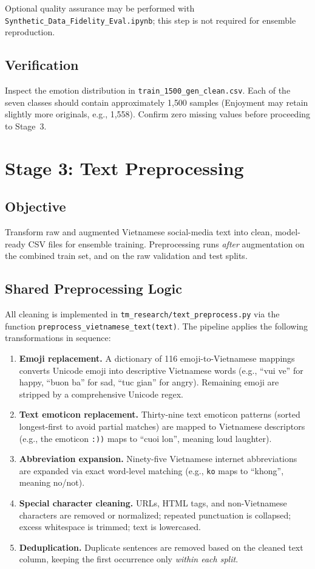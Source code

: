 \documentclass[11pt,a4paper]{article}
\newcommand{\repo}[1]{\texttt{#1}}
\begin{document}
Optional quality assurance may be performed with \repo{Synthetic\_Data\_Fidelity\_Eval.ipynb}; this step is not required for ensemble reproduction.

\subsection{Verification}
Inspect the emotion distribution in \repo{train\_1500\_gen\_clean.csv}. Each of the seven classes should contain approximately 1{,}500 samples (Enjoyment may retain slightly more originals, e.g., 1{,}558). Confirm zero missing values before proceeding to Stage~3.

\section{Stage 3: Text Preprocessing}
\label{sec:preprocessing}

\subsection{Objective}
Transform raw and augmented Vietnamese social-media text into clean, model-ready CSV files for ensemble training. Preprocessing runs \emph{after} augmentation on the combined train set, and on the raw validation and test splits.

\subsection{Shared Preprocessing Logic}
All cleaning is implemented in \repo{tm\_research/text\_preprocess.py} via the function \texttt{preprocess\_vietnamese\_text(text)}. The pipeline applies the following transformations in sequence:
\begin{enumerate}[label=\arabic*.]
  \item \textbf{Emoji replacement.} A dictionary of 116 emoji-to-Vietnamese mappings converts Unicode emoji into descriptive Vietnamese words (e.g., ``vui ve'' for happy, ``buon ba'' for sad, ``tuc gian'' for angry). Remaining emoji are stripped by a comprehensive Unicode regex.
  \item \textbf{Text emoticon replacement.} Thirty-nine text emoticon patterns (sorted longest-first to avoid partial matches) are mapped to Vietnamese descriptors (e.g., the emoticon \lstinline|:))| maps to ``cuoi lon'', meaning loud laughter).
  \item \textbf{Abbreviation expansion.} Ninety-five Vietnamese internet abbreviations are expanded via exact word-level matching (e.g., \texttt{ko} maps to ``khong'', meaning no/not).
  \item \textbf{Special character cleaning.} URLs, HTML tags, and non-Vietnamese characters are removed or normalized; repeated punctuation is collapsed; excess whitespace is trimmed; text is lowercased.
  \item \textbf{Deduplication.} Duplicate sentences are removed based on the cleaned text column, keeping the first occurrence only \emph{within each split}.
\end{enumerate}
\end{document}
